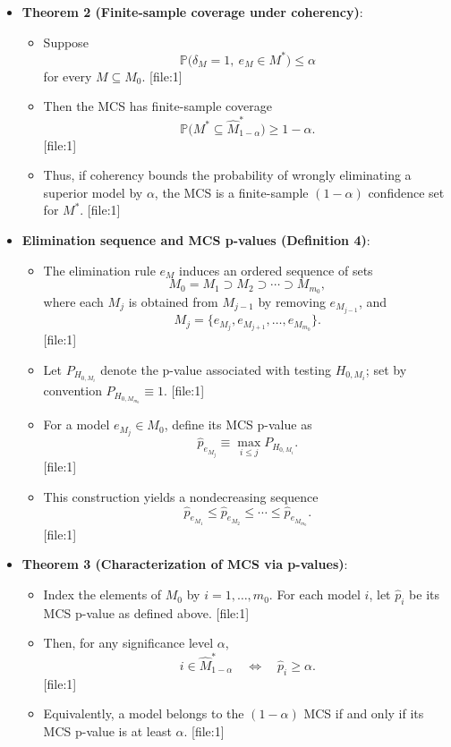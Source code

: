 \begin{itemize}
  \item \textbf{Theorem 2 (Finite-sample coverage under coherency)}:
    \begin{itemize}
      \item Suppose
        \[
          \mathbb{P}\bigl( \delta_M = 1,\ e_M \in M^\ast \bigr) \le \alpha
        \]
        for every $M \subseteq M_0$. [file:1]
      \item Then the MCS has finite-sample coverage
        \[
          \mathbb{P}\bigl( M^\ast \subseteq \widehat{M}^\ast_{1-\alpha} \bigr) \ge 1 - \alpha.
        \] [file:1]
      \item Thus, if coherency bounds the probability of wrongly eliminating a superior model by $\alpha$, the MCS is a finite-sample $(1-\alpha)$ confidence set for $M^\ast$. [file:1]
    \end{itemize}


  \item \textbf{Elimination sequence and MCS p-values (Definition 4)}:
    \begin{itemize}
      \item The elimination rule $e_M$ induces an ordered sequence of sets
        \[
          M_0 = M_1 \supset M_2 \supset \cdots \supset M_{m_0},
        \]
        where each $M_j$ is obtained from $M_{j-1}$ by removing $e_{M_{j-1}}$, and
        \[
          M_j = \{ e_{M_j}, e_{M_{j+1}}, \dots, e_{M_{m_0}} \}.
        \] [file:1]
      \item Let $P_{H_{0,M_i}}$ denote the p-value associated with testing $H_{0,M_i}$; set by convention $P_{H_{0,M_{m_0}}} \equiv 1$. [file:1]
      \item For a model $e_{M_j} \in M_0$, define its MCS p-value as
        \[
          \widehat{p}_{e_{M_j}} \equiv \max_{i \le j} P_{H_{0,M_i}}.
        \] [file:1]
      \item This construction yields a nondecreasing sequence
        \[
          \widehat{p}_{e_{M_1}} \le \widehat{p}_{e_{M_2}} \le \cdots \le \widehat{p}_{e_{M_{m_0}}}.
        \] [file:1]
    \end{itemize}

  \item \textbf{Theorem 3 (Characterization of MCS via p-values)}:
    \begin{itemize}
      \item Index the elements of $M_0$ by $i=1,\dots,m_0$. For each model $i$, let $\widehat{p}_i$ be its MCS p-value as defined above. [file:1]
      \item Then, for any significance level $\alpha$,
        \[
          i \in \widehat{M}^\ast_{1-\alpha}
          \quad \Longleftrightarrow \quad
          \widehat{p}_i \ge \alpha.
        \] [file:1]
      \item Equivalently, a model belongs to the $(1-\alpha)$ MCS if and only if its MCS p-value is at least $\alpha$. [file:1]
    \end{itemize}

\end{itemize}